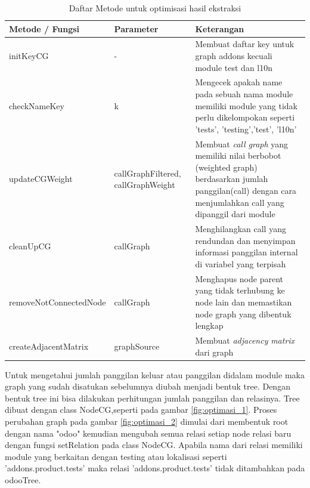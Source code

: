 \begingroup
\setlength{\LTleft}{-20cm plus -1fill}
\setlength{\LTright}{\LTleft}
\begin{small}
	\begin{longtable}{|p{4cm}|p{3cm}|p{6cm}|}
		\caption{Daftar Metode untuk optimisasi hasil ekstraksi}\\
		\hline
		\textbf{Metode / Fungsi} & \textbf{Parameter} & \textbf{Keterangan}\\
		\endfirsthead
		
		 \hline
		 initKeyCG
			& -
		 & Membuat daftar key untuk graph addons kecuali module test dan l10n  \\
		 
		 \hline
		 checkNameKey		 
			& k
		 & Mengecek apakah name pada sebuah nama module memiliki module yang tidak perlu dikelompokan seperti 'tests', 'testing','test', 'l10n' \\

		 \hline
		 updateCGWeight
		& callGraphFiltered, callGraphWeight
		 & Membuat \textit{call graph} yang memiliki nilai berbobot (weighted graph) berdasarkan jumlah panggilan(call) dengan cara menjumlahkan call yang dipanggil dari module \\

		 
		 \hline 
		 cleanUpCG
			& callGraph
		 & Menghilangkan call yang rendundan dan  menyimpan informasi panggilan internal di variabel yang terpisah\\

		 \hline
		 removeNotConnectedNode
		& callGraph
		 & Menghapus node parent yang tidak terhubung ke node lain  dan memastikan node graph yang dibentuk lengkap\\
		

		 \hline  
		createAdjacentMatrix
		& graphSource
		 & Membuat \textit{adjacency} \textit{matrix} dari graph  \\
		
		 \hline  
		 
	\end{longtable}
\end{small}
\endgroup

Untuk mengetahui jumlah panggilan keluar atau panggilan didalam module maka graph yang sudah disatukan sebelumnya diubah menjadi bentuk tree. Dengan bentuk tree ini bisa dilakukan perhitungan jumlah panggilan dan relasinya. Tree dibuat dengan class NodeCG,seperti pada gambar \ref{fig:optimasi_1}. Proses perubahan graph pada gambar \ref{fig:optimasi_2} dimulai dari membentuk root dengan nama "odoo" kemudian mengubah semua relasi setiap node relasi baru dengan fungsi setRelation pada class NodeCG. Apabila nama dari relasi memiliki module yang berkaitan dengan testing atau lokalisasi seperti 'addons.product.tests' maka relasi 'addons.product.tests' tidak  ditambahkan pada odooTree. 


